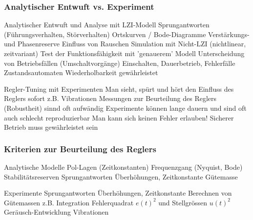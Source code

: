 \subsubsection{Analytischer Entwuft vs. Experiment}

\begin{minipage}[t]{0.48\columnwidth}
    \begin{outline}
        \1 Analytischer Entwuft und Analyse mit LZI-Modell
            \2 Sprungantworten (Führungsverhalten, Störverhalten)
            \2 Ortskurven / Bode-Diagramme
            \2 Verstärkungs- und Phasenreserve
            \2 Einfluss von Rauschen
        \1 Simulation mit Nicht-LZI (nichtlinear, zeitvariant)
            \2 Test der Funktionsfähigkeit mit 'genauerem' Modell
            \2 Unterscheidung von Betriebsfällen (Umschaltvorgänge)
                \3 Einschalten, Dauerbetrieb, Fehlerfälle
                \3 Zustandsautomaten
            \2 Wiederholbarkeit gewährleistet
    \end{outline}
\end{minipage}
\hfill
\begin{minipage}[t]{0.48\columnwidth}
    \begin{outline}
        \1 Regler-Tuning mit Experimenten
            \2 Man sieht, spürt und hört den Einfluss des Reglers sofort
                \3 z.B. Vibrationen
            \2 Messungen zur Beurteilung des Reglers (Robustheit) sinnd oft aufwändig
            \2 Experimente können lange dauern und sind oft auch schlecht reproduzierbar
            \2 Man kann sich keinen Fehler erlauben!
                \3 Sicherer Betrieb muss gewährleistet sein
    \end{outline}
\end{minipage}


\subsubsection{Kriterien zur Beurteilung des Reglers}

\begin{minipage}[t]{0.48\columnwidth}
    \begin{outline}
        \1 Analytische Modelle
            \2 Pol-Lagen (Zeitkonstanten)
            \2 Frequenzgang (Nyquist, Bode)
            \2 Stabilitätsreserven
            \2 Sprungantworten 
                \3 Überhöhungen, Zeitkonstante
            \2 Gütemasse
    \end{outline}
\end{minipage}
\hfill
\begin{minipage}[t]{0.48\columnwidth}
    \begin{outline}
        \1 Experimente
            \2 Sprungantworten
                \3 Überhöhungen, Zeitkonstante
            \2 Berechnen von Gütemassen 
                \3 z.B. Integration Fehlerquadrat $e(t)^2$ und Stellgrössen $u(t)^2$
            \2 Geräusch-Entwicklung
            \2 Vibrationen
    \end{outline}
\end{minipage}


